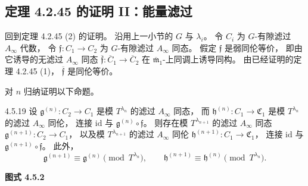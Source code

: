 \subsection{定理 4.2.45 的证明 II：能量滤过}
\label{subsec:4-5-5}

回到定理 4.2.45 (2) 的证明。
沿用上一小节的 $G$ 与 $\lambda_i$。
令 $C_i$ 为 $G$-有隙滤过 $A_\infty$ 代数，
令 $\mathfrak f\colon C_1\to C_2$
为 $G$-有隙滤过 $A_\infty$ 同态。
假定 $\mathfrak f$ 是弱同伦等价，
即由它诱导的无滤过 $A_\infty$ 同态
$\overline{\mathfrak f}\colon
\overline C_1\to\overline C_2$
在 $\overline{\mathfrak m}_1$-上同调上诱导同构。
由已经证明的定理 4.2.45 (1)，
$\overline{\mathfrak f}$ 是同伦等价。

对 $n$ 归纳证明以下命题。
\begin{proposition}{4.5.19}\label{prop:4-5-19}
设 $\mathfrak g^{(n)}\colon C_2\to C_1$
是模 $T^{\lambda_n}$ 的滤过 $A_\infty$ 同态，
而 $\mathfrak h^{(n)}\colon C_1\to\mathfrak C_1$
是模 $T^{\lambda_n}$ 的滤过 $A_\infty$ 同伦，
连接 $\mathrm{id}$ 与
$\mathfrak g^{(n)}\circ\mathfrak f$。
则存在模 $T^{\lambda_{n+1}}$ 的滤过
$A_\infty$ 同态
$\mathfrak g^{(n+1)}\colon C_2\to C_1$，
以及模 $T^{\lambda_{n+1}}$ 的滤过
$A_\infty$ 同伦
$\mathfrak h^{(n+1)}\colon C_1\to\mathfrak C_1$，
连接 $\mathrm{id}$ 与
$\mathfrak g^{(n+1)}\circ\mathfrak f$。
此外，
\[
 \mathfrak g^{(n+1)}
 \equiv\mathfrak g^{(n)}\pmod{T^{\lambda_n}},
 \qquad
 \mathfrak h^{(n+1)}
 \equiv\mathfrak h^{(n)}\pmod{T^{\lambda_n}}.
\]
\end{proposition}

\begin{center}
\par\smallskip\textbf{图式 4.5.2}\label{diag:4-5-2}
\end{center}

